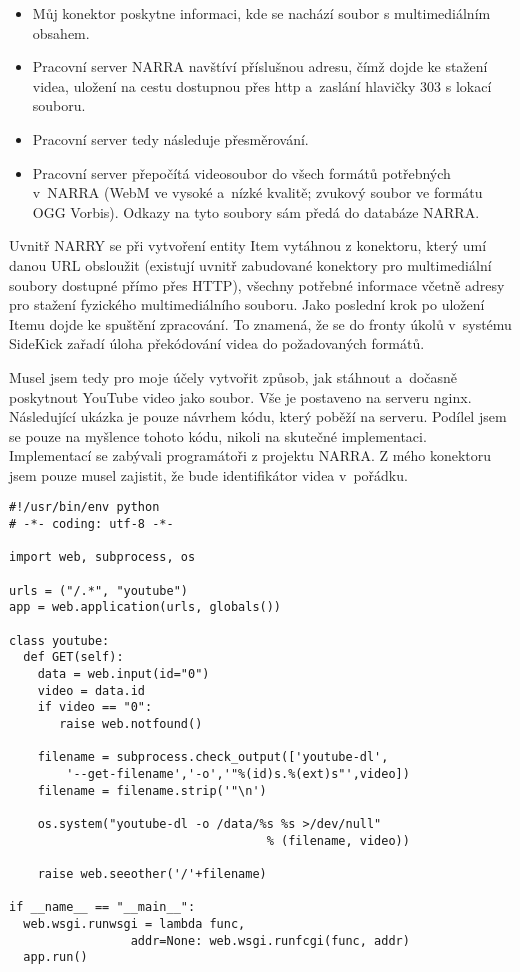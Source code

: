 \begin{itemize}
\item Můj konektor poskytne informaci, kde se nachází soubor s multimediálním obsahem.
\item Pracovní server NARRA navštíví příslušnou adresu, čímž dojde ke stažení videa, uložení na cestu dostupnou přes http a~zaslání hlavičky 303 s lokací souboru.
\item Pracovní server tedy následuje přesměrování. %
\item Pracovní server přepočítá videosoubor do všech formátů potřebných v~NARRA (WebM ve vysoké a~nízké kvalitě; zvukový soubor ve formátu OGG Vorbis). Odkazy na tyto soubory sám předá do databáze NARRA.
\end{itemize}

\par Uvnitř NARRY se při vytvoření entity Item vytáhnou z konektoru, který umí danou URL obsloužit (existují uvnitř zabudované konektory pro multimediální soubory dostupné přímo přes HTTP), všechny potřebné informace včetně adresy pro stažení fyzického multimediálního souboru. Jako poslední krok po uložení Itemu dojde ke spuštění zpracování. To znamená, že se do fronty úkolů v~systému SideKick zařadí úloha překódování videa do požadovaných formátů.
\par Musel jsem tedy pro moje účely vytvořit způsob, jak stáhnout a~dočasně poskytnout YouTube video jako soubor. Vše je postaveno na serveru nginx. Následující ukázka je pouze návrhem kódu, který poběží na serveru. Podílel jsem se pouze na myšlence tohoto kódu, nikoli na skutečné implementaci. Implementací se zabývali programátoři z projektu NARRA. Z mého konektoru jsem pouze musel zajistit, že bude identifikátor videa v~pořádku.

\begin{verbatim}
#!/usr/bin/env python
# -*- coding: utf-8 -*-

import web, subprocess, os

urls = ("/.*", "youtube")
app = web.application(urls, globals())

class youtube:
  def GET(self):
    data = web.input(id="0")
    video = data.id
    if video == "0":
       raise web.notfound()
 
    filename = subprocess.check_output(['youtube-dl',
        '--get-filename','-o','"%(id)s.%(ext)s"',video])
    filename = filename.strip('"\n')
    
    os.system("youtube-dl -o /data/%s %s >/dev/null" 
                                    % (filename, video))
 
    raise web.seeother('/'+filename)
 
if __name__ == "__main__":
  web.wsgi.runwsgi = lambda func, 
                 addr=None: web.wsgi.runfcgi(func, addr)
  app.run()
\end{verbatim}
